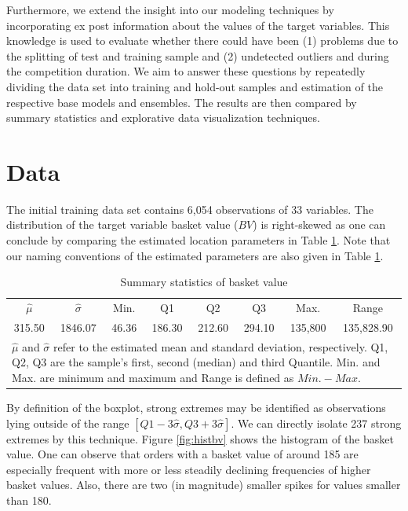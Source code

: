 \documentclass[12pt]{article}
\begin{document}
Furthermore, we extend the insight into our modeling techniques by incorporating ex post information about the values of the target variables. This knowledge is used to evaluate whether there could have been (1) problems due to the splitting of test and training sample and (2) undetected outliers and during the competition duration. We aim to answer these questions by repeatedly dividing the data set into training and hold-out samples and estimation of the respective base models and ensembles. The results are then compared by summary statistics and explorative data visualization techniques.

\section{Data}
\label{sect:data}
The initial training data set contains 6,054 observations of 33 variables. The distribution of the target variable basket value ($BV$) is right-skewed as one can conclude by comparing the estimated location parameters in Table \ref{tab:sumbv}. Note that our naming conventions of the estimated parameters are also given in Table \ref{tab:sumbv}.
\begin{table}[ht]
\centering
\begin{tabular}{cccccccc}
  \hline
  \hline
 $\hat{\mu}$ &  $\hat{\sigma}$ & Min. & Q1 & Q2 & Q3 & Max.  & Range\\ 
315.50 & 1846.07 & 46.36 & 186.30 & 212.60 & 294.10 & 135,800 & 135,828.90\\ 
   \hline
   \hline
\multicolumn{8}{l}{ \parbox{5.2in}{\vspace{1pt} \footnotesize{$\hat{\mu}$ and $\hat{\sigma}$  refer to the estimated mean and standard deviation, respectively. Q1, Q2, Q3 are the sample's first, second (median) and third Quantile. Min. and Max. are minimum and maximum and Range is defined as $Min. - Max.$}}}
\end{tabular}
\vspace{-5pt}
\caption{Summary statistics of basket value}
\label{tab:sumbv}
\end{table}
By definition of the boxplot, strong extremes may be identified as observations lying outside of the range $[Q1 - 3\hat{\sigma} , Q3 + 3\hat{\sigma}]$. We can directly isolate 237 strong extremes by this technique. 
Figure \ref{fig:histbv} shows the histogram of the basket value. One can observe that orders with a basket value of around 185 are especially frequent with more or less steadily declining frequencies of higher basket values. Also, there are two (in magnitude) smaller spikes for values smaller than 180. 
\end{document}
